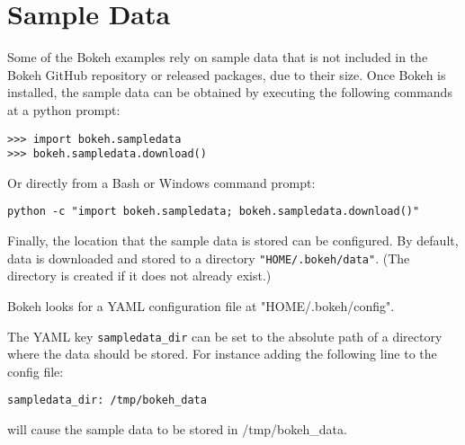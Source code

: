 \section{Sample Data}


Some of the Bokeh examples rely on sample data that is not included in the Bokeh GitHub repository or released packages, due to their size. Once Bokeh is installed, the sample data can be obtained by executing the following commands at a python prompt:

\begin{framed}
\begin{verbatim}
>>> import bokeh.sampledata
>>> bokeh.sampledata.download()
\end{verbatim}
\end{framed}

Or directly from a Bash or Windows command prompt:
\begin{framed}
	\begin{verbatim}
python -c "import bokeh.sampledata; bokeh.sampledata.download()"
\end{verbatim}
\end{framed}

Finally, the location that the sample data is stored can be configured. 
By default, data is downloaded and stored to a directory \texttt{"HOME/.bokeh/data"}. 
(The directory is created if it does not already exist.) 

Bokeh looks for a YAML configuration file at "HOME/.bokeh/config". 

The YAML key \texttt{sampledata\_dir} can be set to the absolute path of a directory 
where the data should be stored. For instance adding the following line to the config file:
\begin{framed}
	\begin{verbatim}
sampledata_dir: /tmp/bokeh_data
\end{verbatim}
\end{framed}
will cause the sample data to be stored in /tmp/bokeh_data.

